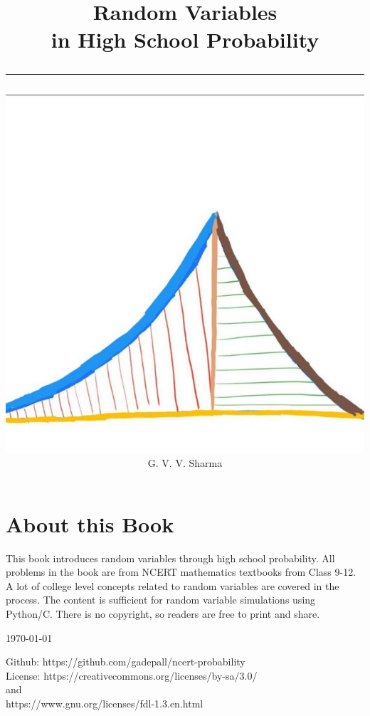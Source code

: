 \documentclass[journal]{IEEEtran}
\begin{document}

\onecolumn


\title{
	\begin{flushleft}
	Random Variables\\ in High School Probability
	\\
\rule{0.4\columnwidth}{0.4pt}
\end{flushleft}
}
\author{
\vspace{7cm}
	\begin{flushleft}
\includegraphics[width=0.2\columnwidth]{figs/logo.jpg}
\\
		{	\huge G. V. V. Sharma}
	\end{flushleft}
}
\maketitle

\newpage

\section*{About this Book}

This book introduces random variables through high school probability. All problems in the book are from NCERT mathematics textbooks from Class 9-12.   
  A lot of college level concepts related to random variables are covered in the process.
The content is sufficient for random variable simulations using Python/C.
There is no copyright, so readers are free to print and share.  
\begin{flushright}
\today
\end{flushright}
Github: https://github.com/gadepall/ncert-probability
		\\
License: https://creativecommons.org/licenses/by-sa/3.0/
\\
and
\\
https://www.gnu.org/licenses/fdl-1.3.en.html

\newpage

\tableofcontents

\newpage
\end{document}
